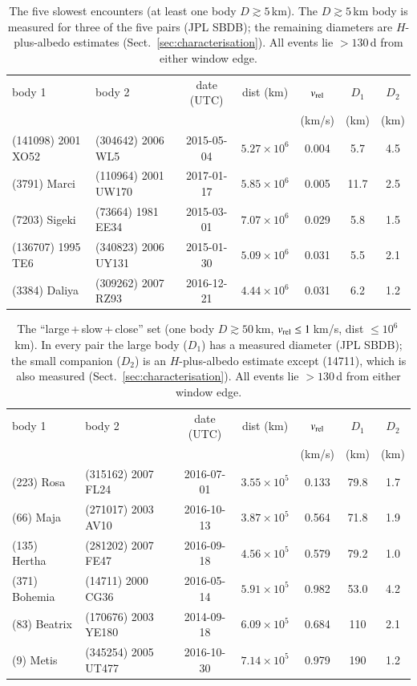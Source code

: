 \documentclass{aa}
\begin{document}
\begin{table}
\caption{The five slowest encounters (at least one body $D\gtrsim5$\,km).
The $D\gtrsim5$\,km body is measured for three of the five pairs (JPL SBDB); the
remaining diameters are $H$-plus-albedo estimates (Sect.~\ref{sec:characterisation}).
All events lie $>130$\,d from either window edge.}
\label{tab:slowest}
\centering
\small
\begin{tabular}{llccccc}
\hline\hline
body 1 & body 2 & date (UTC) & dist (km) & $v_{\rm rel}$ & $D_1$ & $D_2$ \\
       &        &            &           & (km/s)        & (km)  & (km)  \\
\hline
(141098) 2001 XO52 & (304642) 2006 WL5   & 2015-05-04 & $5.27\times10^6$ & 0.004 & 5.7  & 4.5 \\
(3791) Marci       & (110964) 2001 UW170 & 2017-01-17 & $5.85\times10^6$ & 0.005 & 11.7 & 2.5 \\
(7203) Sigeki      & (73664) 1981 EE34   & 2015-03-01 & $7.07\times10^6$ & 0.029 & 5.8  & 1.5 \\
(136707) 1995 TE6  & (340823) 2006 UY131 & 2015-01-30 & $5.09\times10^6$ & 0.031 & 5.5  & 2.1 \\
(3384) Daliya      & (309262) 2007 RZ93  & 2016-12-21 & $4.44\times10^6$ & 0.031 & 6.2  & 1.2 \\
\hline
\end{tabular}
\end{table}

\begin{table}
\caption{The ``large\,+\,slow\,+\,close'' set (one body $D\gtrsim50$\,km,
$v_{\rm rel}\leq1$\,km/s, dist $\leq10^6$\,km). In every pair the large body ($D_1$)
has a measured diameter (JPL SBDB); the small companion ($D_2$) is an
$H$-plus-albedo estimate except (14711), which is also measured
(Sect.~\ref{sec:characterisation}). All events lie $>130$\,d from either window
edge.}
\label{tab:largeslowclose}
\centering
\small
\begin{tabular}{llccccc}
\hline\hline
body 1 & body 2 & date (UTC) & dist (km) & $v_{\rm rel}$ & $D_1$ & $D_2$ \\
       &        &            &           & (km/s)        & (km)  & (km)  \\
\hline
(223) Rosa    & (315162) 2007 FL24  & 2016-07-01 & $3.55\times10^5$ & 0.133 & 79.8 & 1.7 \\
(66) Maja     & (271017) 2003 AV10  & 2016-10-13 & $3.87\times10^5$ & 0.564 & 71.8 & 1.9 \\
(135) Hertha  & (281202) 2007 FE47  & 2016-09-18 & $4.56\times10^5$ & 0.579 & 79.2 & 1.0 \\
(371) Bohemia & (14711) 2000 CG36   & 2016-05-14 & $5.91\times10^5$ & 0.982 & 53.0 & 4.2 \\
(83) Beatrix  & (170676) 2003 YE180 & 2014-09-18 & $6.09\times10^5$ & 0.684 & 110  & 2.1 \\
(9) Metis     & (345254) 2005 UT477 & 2016-10-30 & $7.14\times10^5$ & 0.979 & 190  & 1.2 \\
\hline
\end{tabular}
\end{table}
\end{document}

